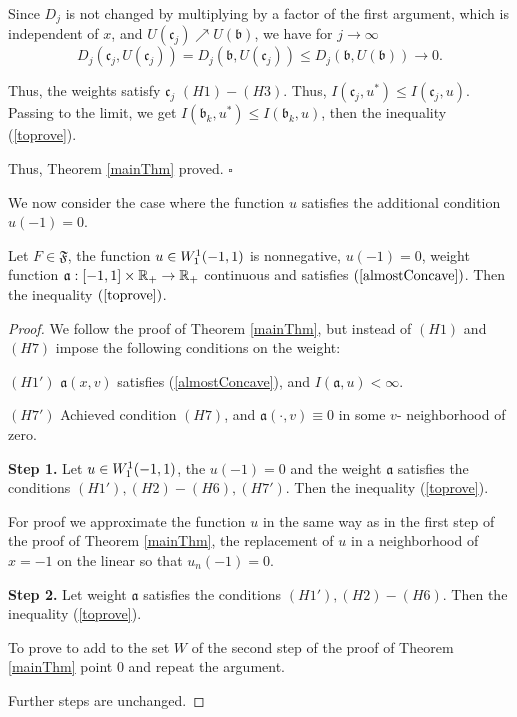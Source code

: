 Since $D_j$ is not changed by multiplying by a factor of the first argument, which is independent of $x$,
and $U(\mathfrak c_j) \nearrow U(\mathfrak b)$, we have for $j \to \infty$
$$D_j(\mathfrak c_j, U(\mathfrak c_j)) = D_j(\mathfrak b, U(\mathfrak c_j)) \le D_j(\mathfrak b, U(\mathfrak b)) \to 0.$$

Thus, the weights satisfy $\mathfrak c_j$ $(H1)-(H3)$.
Thus, $I(\mathfrak c_j, u^*) \le I(\mathfrak c_j, u)$.
Passing to the limit, we get $I(\mathfrak b_k, u^*) \le I(\mathfrak b_k, u)$, then the inequality (\ref{toprove}).

Thus, Theorem \ref{mainThm} proved.
\hfill $\square$

\medskip

We now consider the case where the function $u$ satisfies the additional condition $u(-1) = 0$.
\begin{thm}
Let $F \in \mathfrak{F}$, the function $u \in W_1^1(-1, 1)$ is nonnegative, $u(-1) = 0$,
weight function $\mathfrak a: [-1, 1] \times \mathbb R_+ \to \mathbb R_+$ continuous
and satisfies $(\ref{almostConcave})$.
Then the inequality $(\ref{toprove})$.
\end{thm}

\begin{proof}
We follow the proof of Theorem \ref{mainThm},
but instead of $(H1)$ and $(H7)$ impose the following conditions on the weight:

\bigskip
\noindent
$(H1')$ $\mathfrak a(x, v)$ satisfies (\ref{almostConcave}), and $I(\mathfrak a, u) < \infty$.

\bigskip
\noindent
$(H7')$ Achieved condition $(H7)$, and $\mathfrak a(\cdot, v) \equiv 0$ in some $v$- neighborhood of zero.

\bigskip
{\bf Step 1.} Let $u \in W_1^1(-1, 1)$, the $u(-1) = 0$ and the weight $\mathfrak a$ satisfies the conditions $(H1'), (H2)-(H6), (H7')$.
Then the inequality (\ref{toprove}).

For proof we approximate the function $u$ in the same way as in the first step of the proof of Theorem \ref{mainThm},
the replacement of $u$ in a neighborhood of $x = -1$ on the linear so that $u_n(-1) = 0$.

\bigskip
{\bf Step 2.} Let weight $\mathfrak a$ satisfies the conditions $(H1'), (H2)-(H6)$.
Then the inequality (\ref{toprove}).

To prove to add to the set $W$ of the second step of the proof of Theorem \ref{mainThm} point $0$
and repeat the argument.

\medskip

Further steps are unchanged.
\end{proof}

